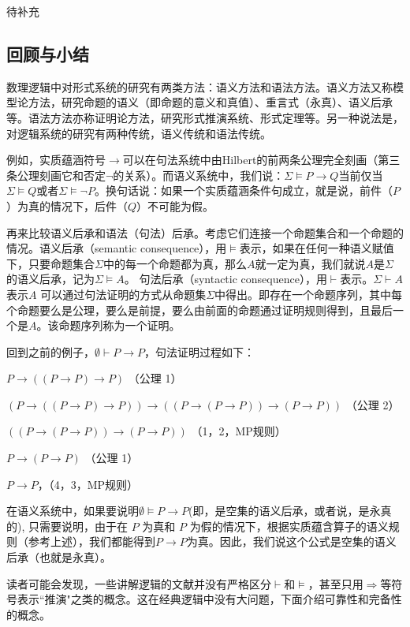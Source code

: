 待补充




\subsection{回顾与小结}


数理逻辑中对形式系统的研究有两类方法：语义方法和语法方法。语义方法又称模型论方法，研究命题的语义（即命题的意义和真值）、重言式（永真）、语义后承等。语法方法亦称证明论方法，研究形式推演系统、形式定理等。另一种说法是，对逻辑系统的研究有两种传统，语义传统和语法传统。

例如，实质蕴涵符号$\to$可以在句法系统中由Hilbert的前两条公理完全刻画（第三条公理刻画它和否定$\neg$的关系）。而语义系统中，我们说：$\Sigma \models P \to Q$当前仅当$\Sigma \models Q$或者$\Sigma \models \neg P$。换句话说：如果一个实质蕴涵条件句成立，就是说，前件（$P$）为真的情况下，后件（$Q$）不可能为假。


再来比较语义后承和语法（句法）后承。考虑它们连接一个命题集合和一个命题的情况。语义后承（semantic consequence），用$\models$表示，如果在任何一种语义赋值下，只要命题集合$\Sigma$中的每一个命题都为真，那么$A$就一定为真，我们就说$A$是$\Sigma$的语义后承，记为$\Sigma \models A$。 句法后承（syntactic consequence），用$\vdash$表示。$\Sigma \vdash A$表示$A$ 可以通过句法证明的方式从命题集$\Sigma$中得出。即存在一个命题序列，其中每个命题要么是公理，要么是前提，要么由前面的命题通过证明规则得到，且最后一个是$A$。该命题序列称为一个证明。


回到之前的例子，$\emptyset \vdash P \to P$，句法证明过程如下：
\begin{tightenum}
 \item $ P \to ((P \to P) \to P)$ （公理 1）
 \item $(P \to ((P \to P) \to P)) \to ((P \to (P \to P)) \to (P \to P))$ （公理 2）
 \item $((P \to (P \to P)) \to (P \to P))$ （1，2，MP规则）
 \item  $P \to (P \to P)$ （公理 1）
 \item  $P \to P$，（4，3，MP规则）
\end{tightenum}

在语义系统中，如果要说明$\emptyset \models P \to P$(即，是空集的语义后承，或者说，是永真的),
只需要说明，由于在 $P$ 为真和 $P$ 为假的情况下，根据实质蕴含算子的语义规则（参考上述），我们都能得到$P \to P$为真。因此，我们说这个公式是空集的语义后承（也就是永真）。


读者可能会发现，一些讲解逻辑的文献并没有严格区分$\vdash$和$\models$，甚至只用$\Rightarrow$等符号表示``推演"之类的概念。这在经典逻辑中没有大问题，下面介绍可靠性和完备性的概念。


